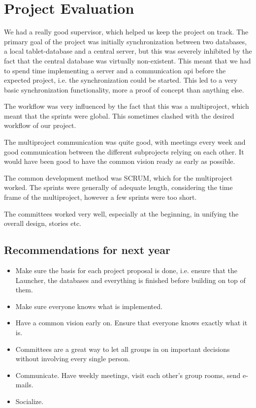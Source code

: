 \section{Project Evaluation}
We had a really good supervisor, which helped us keep the project on track.
The primary goal of the project was initially synchronization between two databases, a local tablet-database and a central server, but this was severely inhibited by the fact that the central database was virtually non-existent. This meant that we had to spend time implementing a server and a communication \ac{api} before the expected project, i.e. the synchronization could be started. This led to a very basic synchronization functionality, more a proof of concept than anything else.

The workflow was very influenced by the fact that this was a multiproject, which meant that the sprints were global. This sometimes clashed with the desired workflow of our project. 

The multiproject communication was quite good, with meetings every week and good communication between the different subprojects relying on each other. It would have been good to have the common vision ready as early as possible. 

The common development method was SCRUM, which for the multiproject worked. The sprints were generally of adequate length, considering the time frame of the multiproject, however a few sprints were too short. 

The committees worked very well, especially at the beginning, in unifying the overall design, stories etc.

\subsection{Recommendations for next year}
\begin{itemize}
\item Make sure the basis for each project proposal is done, i.e. ensure that the Launcher, the databases and everything is finished before building on top of them. 
\item Make sure everyone knows what is implemented.
\item Have a common vision early on. Ensure that everyone knows exactly what it is.
\item Committees are a great way to let all groups in on important decisions without involving every single person.
\item Communicate. Have weekly meetings, visit each other's group rooms, send e-mails.
\item Socialize.
\end{itemize}
